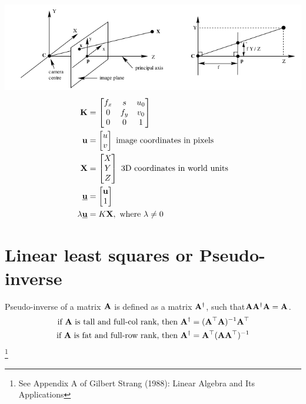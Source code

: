 \documentclass{article}
\begin{document}
\includegraphics[width=\linewidth]{media/pinhole-camera-model-2.png}
\newcommand{\ubfu}{\underline{\bfu}}
\newcommand{\ubfX}{\underline{\bfX}}
\begin{align}
  \bfK &= \begin{bmatrix}
    f_x & s & u_0 \\
    0 & f_y & v_0 \\
    0 & 0 & 1 \\
  \end{bmatrix}
  \\
  \bfu &= \begin{bmatrix} u   \\ v \end{bmatrix} \text{ image coordinates in pixels} \\
  \bfX &= \begin{bmatrix} X   \\  Y   \\ Z\end{bmatrix} \text{ 3D coordinates in world units}\\
  \ubfu &= \begin{bmatrix} \bfu \\   1\end{bmatrix} \\
  \lambda \ubfu &= K \bfX, \text{ where } \lambda \ne 0
\end{align}
\section{Linear least squares  or  Pseudo-inverse}

Pseudo-inverse of a matrix  $\mathbf{A}$ is defined   as a matrix $\mathbf{A}^\dagger$, such
that$\mathbf{A} \mathbf{A}^\dagger \mathbf{A} =  \mathbf{A}$.
\begin{align}
  \text{if } \mathbf{A} \text{ is tall and full-col rank, then } \mathbf{A}^\dagger &= (\mathbf{A}^\top \mathbf{A})^{-1} \mathbf{A}^\top \\
  \text{if } \mathbf{A} \text{ is fat and full-row rank, then } \mathbf{A}^\dagger &=  \mathbf{A}^\top (\mathbf{A} \mathbf{A}^\top)^{-1}
\end{align}\footnote{See Appendix A of Gilbert Strang (1988): Linear Algebra
  and Its Applications}
\end{document}
